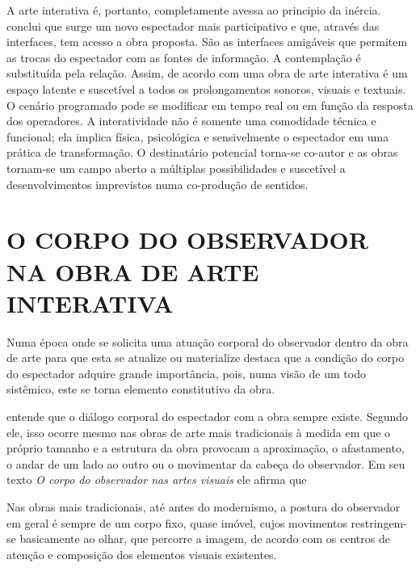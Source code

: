 A arte interativa é, portanto, completamente avessa ao principio da inércia.  conclui que surge um novo espectador mais participativo e que, através das interfaces, tem acesso a obra proposta. São as interfaces amigáveis que permitem as trocas do espectador com as fontes de informação. A contemplação é substituída pela relação. Assim, de acordo com  uma obra de arte interativa é um espaço latente e suscetível a todos os prolongamentos sonoros, visuais e textuais. O cenário programado pode se modificar em tempo real ou em função da resposta dos operadores. A interatividade não é somente uma comodidade técnica e funcional; ela implica física, psicológica e sensivelmente o espectador em uma prática de transformação. O destinatário potencial torna-se co-autor e as obras tornam-se um campo aberto a múltiplas possibilidades e suscetível a desenvolvimentos imprevistos numa co-produção de sentidos.	

\section{O CORPO DO OBSERVADOR NA OBRA DE ARTE INTERATIVA}
	
Numa época onde se solicita uma atuação corporal do observador dentro da obra de arte para que esta se atualize ou materialize  destaca que a condição do corpo do espectador adquire grande importância, pois, numa visão de um todo sistêmico, este se torna elemento constitutivo da obra.
	
 entende que o diálogo corporal do espectador com a obra sempre existe. Segundo ele, isso ocorre mesmo nas obras de arte mais tradicionais à medida em que o próprio tamanho e a estrutura da obra provocam a aproximação, o afastamento, o andar de um lado ao outro ou o movimentar da cabeça do observador. Em seu texto \textit{O corpo do observador nas artes visuais} ele afirma que

\begin{citacao}
Nas obras mais tradicionais, até antes do modernismo, a postura do observador em geral é sempre de um corpo fixo, quase imóvel, cujos movimentos restringem-se basicamente ao olhar, que percorre a imagem, de acordo com os centros de atenção e composição dos elementos visuais existentes. \cite{sogabe} 
\end{citacao}


